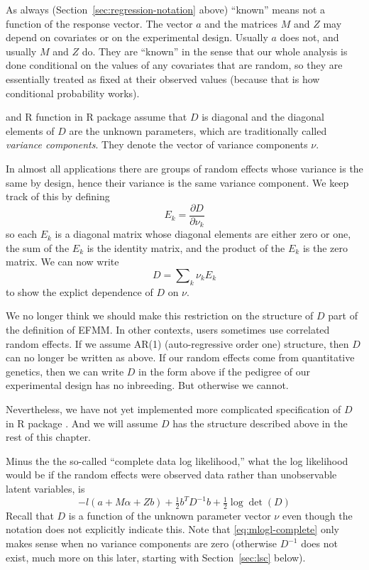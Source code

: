 As always (Section~\ref{sec:regression-notation} above) ``known'' means
not a function of the response vector.  The vector $a$ and the matrices
$M$ and $Z$ may depend on covariates or on the experimental design.
Usually $a$ does not, and usually $M$ and $Z$ do.  They are ``known'' in
the sense that our whole analysis is done conditional on the values of any
covariates that are random, so they are essentially treated as fixed at their
observed values (because that is how conditional probability works).

\citet{reaster} and R function  in R package 
assume that $D$ is diagonal and the diagonal elements of $D$ are the unknown
parameters, which are traditionally called \emph{variance components}.
They denote the vector of variance components $\nu$.

In almost all applications there are groups of random effects whose variance
is the same by design, hence their variance is the same variance component.
We keep track of this by defining
\begin{equation} \label{eq:eek}
   E_k = \frac{\partial D}{\partial \nu_k}
\end{equation}
so each $E_k$ is a diagonal matrix whose diagonal elements are either zero
or one, the sum of the $E_k$ is the identity matrix, and the product of the
$E_k$ is the zero matrix.
We can now write
$$
   D = \sum\nolimits_k \nu_k E_k
$$
to show the explict dependence of $D$ on $\nu$.

We no longer think we should make this restriction on the structure of $D$
part of the definition of EFMM.  In other contexts, users sometimes use
correlated random effects.  If we assume AR(1) (auto-regressive order one)
structure, then $D$ can no longer be written as above.  If our random effects
come from quantitative genetics, then we can write $D$ in the form above if
the pedigree of our experimental design has no inbreeding.  But otherwise we
cannot.

Nevertheless, we have not yet implemented more complicated
specification of $D$ in R package .
And we will assume $D$ has the structure described above in the rest of this
chapter.

Minus the the so-called ``complete data log likelihood,''
what the log likelihood would
be if the random effects were observed data rather than unobservable latent
variables, is
\begin{equation} \label{eq:mlogl-complete}
   - l(a + M \alpha + Z b) + \tfrac{1}{2} b^T D^{-1} b
   + \tfrac{1}{2} \log \det(D)
\end{equation}
Recall that $D$ is a function of the unknown parameter vector $\nu$
even though the notation does not explicitly indicate this.
Note that \eqref{eq:mlogl-complete} only makes sense when no variance
components are zero (otherwise $D^{-1}$ does not exist, much more on this
later, starting with Section~\ref{sec:lsc} below).


